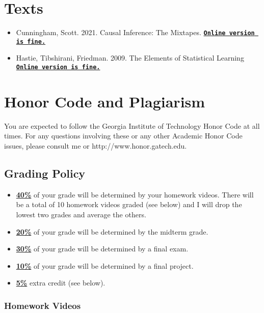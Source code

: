 \documentclass[11pt]{article}
\begin{document}
\section*{Texts}

\begin{itemize}
\item Cunningham, Scott. 2021. Causal Inference: The Mixtapes.  \href{https://mixtape.scunning.com/}{\tt\bf  Online version is fine.} 

\item Hastie, Tibshirani, Friedman. 2009.  The Elements of Statistical Learning  \href{https://hastie.su.domains/ElemStatLearn/}{\tt\bf  Online version is fine.} 

\end{itemize} 


\section*{Honor Code and Plagiarism}
You are expected to follow the Georgia Institute of Technology Honor Code at all times. 
For any questions involving these or any other Academic Honor Code issues, please consult me or
http://www.honor.gatech.edu.


\subsection*{Grading Policy}
\begin{itemize}
\item \underline{\textbf{40\%}} of your grade will be determined by your homework videos. There will be a total of 10 homework videos graded (see below) and I will drop the lowest two grades and average the others. 
\item \underline{\textbf{20\%}} of your grade will be determined by the midterm grade. 
\item \underline{\textbf{30\%}} of your grade will be determined by a final exam.
\item \underline{\textbf{10\%}} of your grade will be determined by a final project.
\item \underline{\textbf{5\%}} extra credit (see below). 
\end{itemize}

\subsubsection*{Homework Videos}
\end{document}
